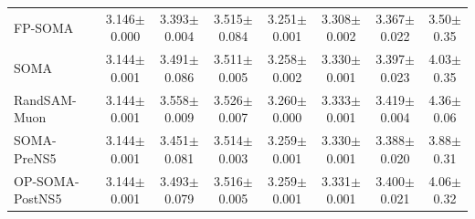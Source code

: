 \begin{table}[t]
{\begin{tabular}{lccccccc}
    FP-SOMA & 3.146{\scriptsize$\pm$0.000} & 3.393{\scriptsize$\pm$0.004} & 3.515{\scriptsize$\pm$0.084} & 3.251{\scriptsize$\pm$0.001} & 3.308{\scriptsize$\pm$0.002} & 3.367{\scriptsize$\pm$0.022} & 3.50{\scriptsize$\pm$0.35} \\
    SOMA & 3.144{\scriptsize$\pm$0.001} & 3.491{\scriptsize$\pm$0.086} & 3.511{\scriptsize$\pm$0.005} & 3.258{\scriptsize$\pm$0.002} & 3.330{\scriptsize$\pm$0.001} & 3.397{\scriptsize$\pm$0.023} & 4.03{\scriptsize$\pm$0.35} \\
    RandSAM-Muon & 3.144{\scriptsize$\pm$0.001} & 3.558{\scriptsize$\pm$0.009} & 3.526{\scriptsize$\pm$0.007} & 3.260{\scriptsize$\pm$0.000} & 3.333{\scriptsize$\pm$0.001} & 3.419{\scriptsize$\pm$0.004} & 4.36{\scriptsize$\pm$0.06} \\
    SOMA-PreNS5 & 3.144{\scriptsize$\pm$0.001} & 3.451{\scriptsize$\pm$0.081} & 3.514{\scriptsize$\pm$0.003} & 3.259{\scriptsize$\pm$0.001} & 3.330{\scriptsize$\pm$0.001} & 3.388{\scriptsize$\pm$0.020} & 3.88{\scriptsize$\pm$0.31} \\
    OP-SOMA-PostNS5 & 3.144{\scriptsize$\pm$0.001} & 3.493{\scriptsize$\pm$0.079} & 3.516{\scriptsize$\pm$0.005} & 3.259{\scriptsize$\pm$0.001} & 3.331{\scriptsize$\pm$0.001} & 3.400{\scriptsize$\pm$0.021} & 4.06{\scriptsize$\pm$0.32} \\
    \bottomrule
  \end{tabular}}
\end{table}

